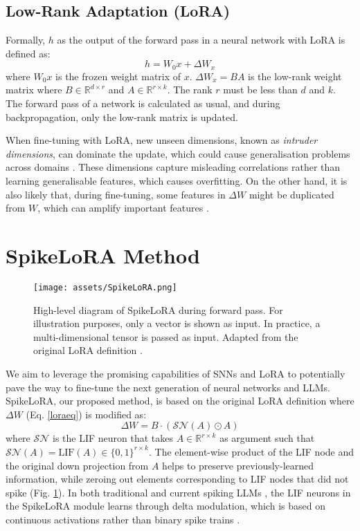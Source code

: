 \documentclass{article} %
\begin{document}
\subsection{Low-Rank Adaptation (LoRA)}
\label{lora}

Formally, \(h\) as the output of the forward pass in a neural network with LoRA is defined as:
\begin{equation}\label{loraeq}
  h = W_0x + \Delta{W_x}
\end{equation}
where \(W_0x\) is the frozen weight matrix of \(x\). \(\Delta{W_x} = BA\) is the low-rank weight matrix where \(B \in \mathbb{R}^{d \times r}\) and \(A \in \mathbb{R}^{r \times k}\). The rank \(r\) must be less than \(d\) and \(k\). The forward pass of a network is calculated as usual, and during backpropagation, only the low-rank matrix is updated.

When fine-tuning with LoRA, new unseen dimensions, known as \emph{intruder dimensions}, can dominate the update, which could cause generalisation problems across domains \citep{shuttleworth_lora_2024}. These dimensions capture misleading correlations rather than learning generalisable features, which causes overfitting. On the other hand, it is also likely that, during fine-tuning, some features in \(\Delta{W}\) might be duplicated from \(W\), which can amplify important features \citep{hu_lora_2022}.

\section{SpikeLoRA Method}
\label{method}
\begin{figure}[ht!]
  \centering
  \texttt{[image: assets/SpikeLoRA.png]}
  \caption{High-level diagram of SpikeLoRA during forward pass. For illustration purposes, only a vector is shown as input. In practice, a multi-dimensional tensor is passed as input. Adapted from the original LoRA definition \citep{hu_lora_2022}.}
  \label{fig:SpikeLoRA}
\end{figure}

We aim to leverage the promising capabilities of SNNs and LoRA to potentially pave the way to fine-tune the next generation of neural networks and LLMs. SpikeLoRA, our proposed method, is based on the original LoRA definition \citep{hu_lora_2022} where \(\Delta W\) (Eq. \ref{loraeq}) is modified as:
\begin{equation}\label{LoRAeq}
  \Delta{W} = B \cdot ({\mathcal{SN}}(A) \odot A)
\end{equation}
where \({\mathcal{SN}}\) is the LIF neuron that takes \(A \in \mathbb{R}^{r\times k}\) as argument such that \({\mathcal{SN}}(A) = \text{LIF}(A) \in \{0,1\}^{r\times k}\). The element-wise product of the LIF node and the original down projection from \(A\) helps to preserve previously-learned information, while zeroing out elements corresponding to LIF nodes that did not spike (Fig. \ref{fig:SpikeLoRA}). In both traditional and current spiking LLMs \citep{zhu_spikegpt_2024-1}, the LIF neurons in the SpikeLoRA module learns through delta modulation, which is based on continuous activations rather than binary spike trains \citep{eshraghian_training_2023-1}.
\end{document}

